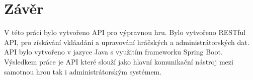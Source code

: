 \chapter{Závěr}
V této práci bylo vytvořeno API pro výpravnou hru. Bylo vytvořeno RESTful API, pro získávání vkláadání a upravování hráčských a administrátorských dat. API bylo vytvořeno v jazyce Java s využitím frameworku Spring Boot. Výsledkem práce je API které slouží jako hlavní komunikační nástroj mezi samotnou hrou tak i administrátorským systémem.
\endinput
